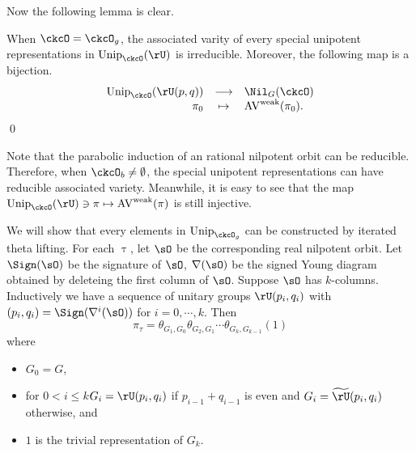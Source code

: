 \documentclass[counting_main.tex]{subfiles}
\begin{document}
Now the following lemma is clear.
\begin{lem}
When $\ckcO=\ckcO_g$, the associated varity of every special unipotent representations in $\Unip_\ckcO(\rU)$
is irreducible. Moreover, the following map  is a bijection.
\[
  \begin{array}{rcl}
  \Unip_{\ckcO}(\rU(p,q)) &\longrightarrow& \Nil_{G}(\ckcO)\\
  \pi_0 & \mapsto & \wAV(\pi_0).
  \end{array}
\]
\qed
\end{lem}
\begin{remark}
  Note that the parabolic induction of an rational nilpotent orbit can be reducible.
  Therefore, when $\ckcO_b\neq \emptyset$, the special unipotent representations can have
  reducible associated variety. Meanwhile, it is easy to see that the map
  $\Unip_{\ckcO}(\rU) \ni \pi \mapsto\wAV(\pi)$ is still injective.
\end{remark}

We will show that every elements in $\Unip_{\ckcO_g}$ can be constructed by iterated theta lifting.
For each $\uptau$, let $\sO$ be the corresponding real nilpotent orbit. Let
$\Sign(\sO)$ be the signature of $\sO$, $\DD(\sO)$ be the signed Young diagram
obtained by deleteing the first column of $\sO$.
Suppose $\sO$ has $k$-columns. Inductively we have a sequence of unitary groups
$\rU(p_i,q_i)$ with $(p_i,q_i) = \Sign(\DD^i(\sO))$ for $i=0, \cdots, k$. Then
\begin{equation}\label{eq:u.U}
  \pi_\tau = \theta_{G_{1},G_{0}} \theta_{G_{2},G_{1}}\cdots \theta_{G_{k},G_{k-1}} (1)
\end{equation}
where
\begin{itemize}
  \item
  $G_{0}=G$,
  \item for $0<i\leq k$$G_{i} = \rU(p_{i},q_{i})$ if $p_{i-1}+q_{i-1}$ is even and
 $G_{i} = \tU(p_{i},q_{i})$ otherwise, and
  \item
$1$ is the trivial representation of $G_{k}$.
\end{itemize}


\end{document}
